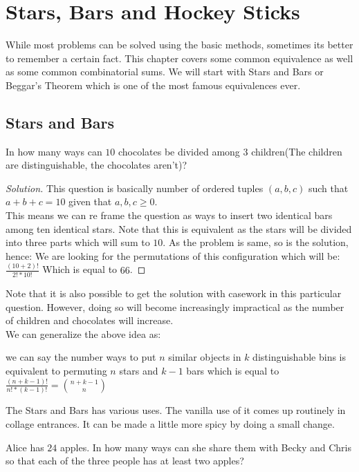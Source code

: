\chapter{Stars, Bars and Hockey Sticks}
While most problems can be solved using the basic methods, sometimes its better to remember a certain fact. This chapter covers some common equivalence as well as some common combinatorial sums. We will start with Stars and Bars or Beggar's Theorem which is one of the most famous equivalences ever.\\
\section{Stars and Bars}
\begin{example}
     In how many ways can $10$ chocolates be divided among $3$ children(The children are distinguishable, the chocolates aren't)?
\end{example}
\begin{proof}
    [Solution]
    This question is basically number of ordered tuples $(a,b,c)$ such that $a+b+c=10$ given that $a,b,c \geq 0$.\\
This means we can re frame the question as ways to insert two identical bars among ten identical stars. Note that this is equivalent as the stars will be divided into three parts which will sum to $10$. As the problem is same, so is the solution, hence:
We are looking for the permutations of this configuration which will be: $\frac{(10+2)!}{2!*10!}$ Which is equal to $66$.
\end{proof}
Note that it is also possible to get the solution with casework in this particular question. However, doing so will become increasingly impractical as the number of children and chocolates will increase.\\ 
We can generalize the above idea as: 
\begin{theorem}
    we can say the number ways to put $n$ similar objects in $k$ distinguishable bins is equivalent to permuting $n$ stars and $k-1$ bars which is equal to $\frac{(n+k-1)!}{n!*(k-1)!}=\binom{n+k-1}{n}$
\end{theorem}
The Stars and Bars has various uses. The vanilla use of it comes up routinely in collage entrances. It can be made a little more spicy by doing a small change.
\begin{example}
    Alice has $24$ apples. In how many ways can she share them with Becky and Chris so that each of the three people has at least two apples?
\end{example}
